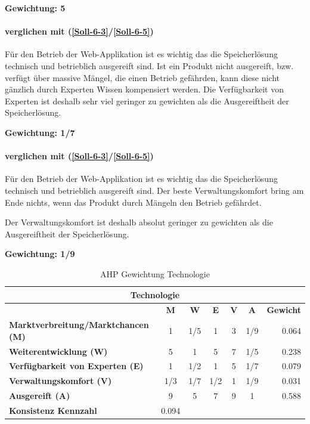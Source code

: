\textbf{Gewichtung: 5}

\paragraph*{ verglichen mit  (\ref{Soll-6-3}/\ref{Soll-6-5})}
Für den Betrieb der Web-Applikation ist es wichtig das die Speicherlösung technisch und betrieblich ausgereift sind. Ist ein Produkt nicht ausgereift, bzw. verfügt über massive Mängel, die einen Betrieb gefährden, kann diese nicht gänzlich durch Experten Wissen kompensiert werden. Die Verfügbarkeit von Experten ist deshalb sehr viel geringer zu gewichten als die Ausgereiftheit der Speicherlösung.

\textbf{Gewichtung: 1/7}

\paragraph*{ verglichen mit  (\ref{Soll-6-3}/\ref{Soll-6-5})}
Für den Betrieb der Web-Applikation ist es wichtig das die Speicherlösung technisch und betrieblich ausgereift sind. Der beste Verwaltungskomfort bring am Ende nichts, wenn das Produkt durch Mängeln den Betrieb gefährdet.

Der Verwaltungskomfort ist deshalb absolut geringer zu gewichten als die Ausgereiftheit der Speicherlösung.

\textbf{Gewichtung: 1/9}

\begin{table}[htbp]
\caption{AHP Gewichtung Technologie}
\begin{tabular}{|l|c|c|c|c|c|r|}
\hline
\multicolumn{ 7}{|c|}{\textbf{Technologie}} \\ \hline
 & \textbf{M} & \textbf{W} & \textbf{E} & \textbf{V} & \textbf{A} & \multicolumn{1}{l|}{\textbf{Gewicht}} \\ \hline
\textbf{Marktverbreitung/Marktchancen (M)} & 1 & 1/5 & 1 & 3 & 1/9 & 0.064 \\ \hline
\textbf{Weiterentwicklung (W)} & 5 & 1 & 5 & 7 & 1/5 & 0.238 \\ \hline
\textbf{Verfügbarkeit von Experten (E)} & 1 & 1/2 & 1 & 5 & 1/7 & 0.079 \\ \hline
\textbf{Verwaltungskomfort (V)} & 1/3 & 1/7 & 1/2 & 1 & 1/9 & 0.031 \\ \hline
\textbf{Ausgereift (A)} & 9 & 5 & 7 & 9 & 1 & 0.588 \\ \hline
\textbf{Konsistenz Kennzahl} & \multicolumn{1}{r|}{0.094} \\ \cline{1-2}
\end{tabular}
\label{tab:AHPTechnologie}
\end{table}


